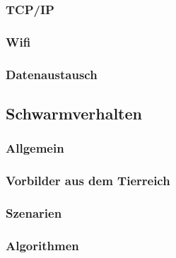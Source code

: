 \subsubsection{TCP/IP}
\subsubsection{Wifi}
\subsubsection{Datenaustausch} %

\subsection{Schwarmverhalten}
\subsubsection{Allgemein}
\subsubsection{Vorbilder aus dem Tierreich}
\subsubsection{Szenarien}
\subsubsection{Algorithmen}